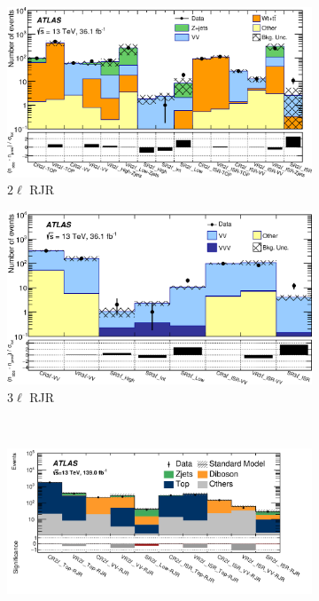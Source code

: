 \begin{figure}[tp]
\centering
\begin{subfigure}{0.495\textwidth}
\centering
\includegraphics[width=\textwidth]{figures/2ljets_rjr_23l_2l_summary.png}
\caption{$2\ell$ RJR~\cite{atlas_rjr_23l_SUSY_2017_03}}
\label{fig:2ljets_rjr_summaries_2017_2l}
\end{subfigure}
\hfill
\begin{subfigure}{0.495\textwidth}
\centering
\includegraphics[width=\textwidth]{figures/2ljets_rjr_23l_3l_summary.png}
\caption{$3\ell$ RJR~\cite{atlas_rjr_23l_SUSY_2017_03}}
\label{fig:2ljets_rjr_summaries_2017_3l}
\end{subfigure}
\\[0.5em]
\begin{subfigure}{0.9\textwidth}
\centering
\includegraphics[width=\textwidth]{figures/2ljets_rjr_summary_log.pdf}

\end{subfigure}
\end{figure}
